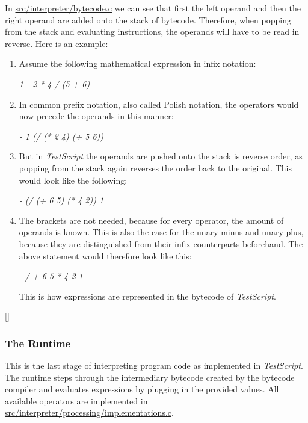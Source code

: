 \documentclass[12pt,a4paper]{article}
\newcommand{\hrc}[1]{\hyperref[#1]{#1}}
\newcommand{\expr}[1] {
    \begin{center}
        #1
    \end{center}
}
\newcommand{\name}{\emph{TestScript}}
\begin{document}
In \hrc{src/interpreter/bytecode.c} we can see that first the left operand and then
the right operand are added onto the stack of bytecode. Therefore, when
popping from the stack and evaluating instructions, the operands will have to
be read in reverse.
Here is an example:
\begin{enumerate}
    \item Assume the following mathematical expression in infix notation:
        \expr{\emph{1 - 2 * 4 / (5 + 6)}}
    \item In common prefix notation, also called Polish notation, the
        operators would now precede the operands in this manner:
        \expr{\emph{- 1 (/ (* 2 4) (+ 5 6))}}
    \item But in \name{} the operands are pushed onto the stack is reverse order,
        as popping from the stack again reverses the order back to the original.
        This would look like the following:
        \expr{\emph{- (/ (+ 6 5) (* 4 2)) 1}}
    \item The brackets are not needed, because for every operator, the amount
        of operands is known. This is also the case for the unary minus and unary plus,
        because they are distinguished from their infix counterparts beforehand.
        The above statement would therefore look like this:
        \expr{\emph{- / + 6 5 * 4 2 1}}
        This is how expressions are represented in the bytecode of \name{}.
\end{enumerate}
[]

\subsubsection{The Runtime}
This is the last stage of interpreting program code as implemented in \name{}.
The runtime steps through the intermediary bytecode created by the bytecode
compiler and evaluates expressions by plugging in the provided values.
All available operators are implemented in 
\hrc{src/interpreter/processing/implementations.c}.
\end{document}
